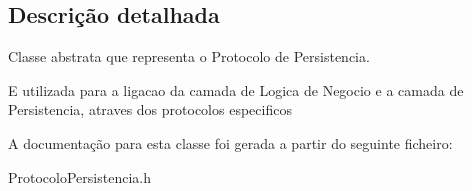 \subsection{\-Descrição detalhada}
\-Classe abstrata que representa o \-Protocolo de \-Persistencia. 

\-E utilizada para a ligacao da camada de \-Logica de \-Negocio e a camada de \-Persistencia, atraves dos protocolos especificos 

\-A documentação para esta classe foi gerada a partir do seguinte ficheiro\-:\begin{DoxyCompactItemize}
\item 
\-Protocolo\-Persistencia.\-h\end{DoxyCompactItemize}
